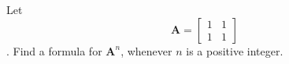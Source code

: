 
%
%
%

	Let
	$$\mathbf{A} = \begin{bmatrix} 1 & 1 \\ 1 & 1 \end{bmatrix}$$.
	Find a formula for $\mathbf{A}^n$,
	whenever $n$ is a positive integer.

\solution
	
